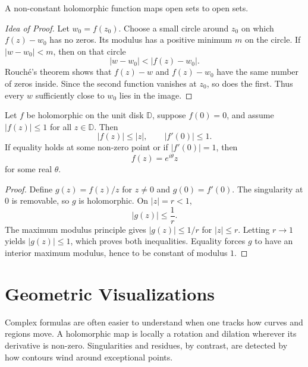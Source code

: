 \begin{theorem}
A non-constant holomorphic function maps open sets to open sets.
\end{theorem}

\begin{proof}[Idea of Proof]
Let $w_0=f(z_0)$. Choose a small circle around $z_0$ on which $f(z)-w_0$ has no zeros. Its modulus has a positive minimum $m$ on the circle. If $|w-w_0|<m$, then on that circle
\[
    |w-w_0|<|f(z)-w_0|.
\]
Rouché's theorem shows that $f(z)-w$ and $f(z)-w_0$ have the same number of zeros inside. Since the second function vanishes at $z_0$, so does the first. Thus every $w$ sufficiently close to $w_0$ lies in the image.
\end{proof}

\begin{theorem}
Let $f$ be holomorphic on the unit disk $\mathbb{D}$, suppose $f(0)=0$, and assume $|f(z)|\leq1$ for all $z\in\mathbb{D}$. Then
\[
    |f(z)|\leq|z|,
    \qquad
    |f'(0)|\leq1.
\]
If equality holds at some non-zero point or if $|f'(0)|=1$, then
\[
    f(z)=e^{i\theta}z
\]
for some real $\theta$.
\end{theorem}

\begin{proof}
Define $g(z)=f(z)/z$ for $z\neq0$ and $g(0)=f'(0)$. The singularity at $0$ is removable, so $g$ is holomorphic. On $|z|=r<1$,
\[
    |g(z)|\leq\frac1r.
\]
The maximum modulus principle gives $|g(z)|\leq1/r$ for $|z|\leq r$. Letting $r\to1$ yields $|g(z)|\leq1$, which proves both inequalities. Equality forces $g$ to have an interior maximum modulus, hence to be constant of modulus $1$.
\end{proof}

\section{Geometric Visualizations}

Complex formulas are often easier to understand when one tracks how curves and regions move. A holomorphic map is locally a rotation and dilation wherever its derivative is non-zero. Singularities and residues, by contrast, are detected by how contours wind around exceptional points.

